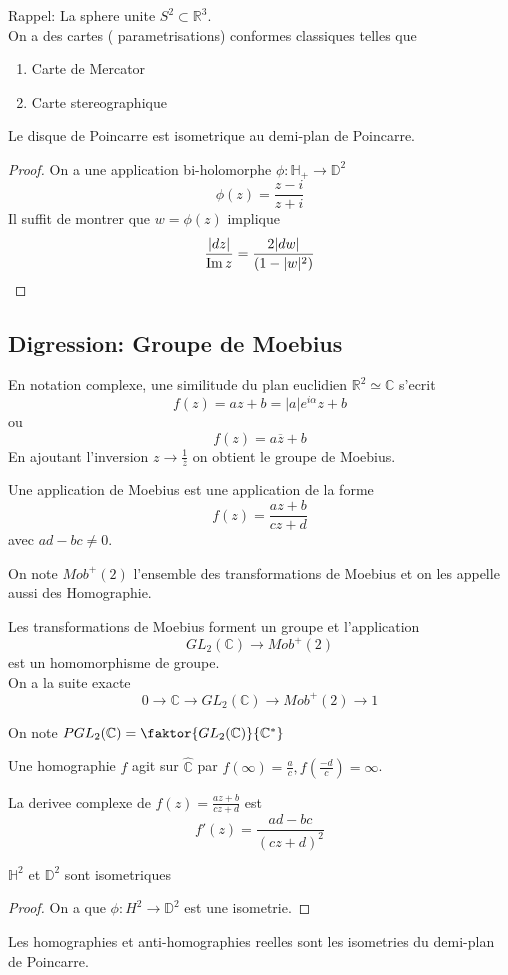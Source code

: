 \documentclass[../main.tex]{subfiles}
\begin{document}
Rappel: La sphere unite  $S^{2} \subset \mathbb{R}^{3}$.\\
On a des cartes ( parametrisations) conformes classiques telles que
\begin{enumerate}
\item Carte de Mercator
\item Carte stereographique 
\end{enumerate}
\begin{propo}
Le disque de Poincarre est isometrique au demi-plan de Poincarre.
\end{propo}
\begin{proof}
On a une application bi-holomorphe $\phi: \mathbb{H}_+ \to \mathbb{D}^{2}$ 
\[ 
\phi( z) = \frac{z-i}{z+i}
\]
Il suffit de montrer que $w= \phi( z) $ implique
\[ 
\frac{|dz|}{\operatorname{Im} z}= \frac{2 |dw|}{( 1-|w|^{2}) }
\]

\end{proof}
\subsection*{Digression: Groupe de Moebius}
En notation complexe, une similitude du plan euclidien $ \mathbb{R}^{2} \simeq \mathbb{C}$ s'ecrit 
\[ 
f( z) = az+ b = |a| e^{i\alpha} z + b
\]
ou
\[ 
f( z) = a \overline{z}+ b
\]
En ajoutant l'inversion $z \to \frac{1}{ \overline{z}}$ on obtient le groupe de Moebius.
\begin{defn}
Une application de Moebius est une application de la forme
\[ 
f( z) = \frac{az + b}{cz+d}
\]
avec $ad- bc \neq 0 $.	
\end{defn}
On note $ Mob^{+}( 2) $ l'ensemble des transformations de Moebius et on les appelle aussi des Homographie.	
\begin{propo}
Les transformations de Moebius forment un groupe et l'application 
\[ 
GL_2( \mathbb{C}) \to Mob^{+}( 2) 
\]
est un homomorphisme de groupe.\\
On a la suite exacte
\[ 
0 \to \mathbb{C}\to GL_2( \mathbb{C}) \to Mob^{+}( 2) \to 1
\]

On note $PGL_2(  \mathbb{C}) = \faktor{ GL_2( \mathbb{C}) }{ \mathbb{C}^{*}}$ 

\end{propo}
Une homographie $f$ agit sur $ \hat{ \mathbb{C}}$ par $f( \infty ) = \frac{a}{c}, f( \frac{-d}{c}) = \infty $.

\begin{lemma}
La derivee complexe de $f( z) = \frac{az+b}{cz+ d}$ est 
\[ 
f'( z) = \frac{ad- bc}{( cz+ d) ^{2}}
\]

\end{lemma}
\begin{propo}
$ \mathbb{H}^{2}$ et $ \mathbb{D}^{2}$ sont isometriques
\end{propo}
\begin{proof}
On a que $\phi: H^{2}\to \mathbb{D}^{2}$ est une isometrie.
\end{proof}
\begin{propo}
Les homographies et anti-homographies reelles sont les isometries du demi-plan de Poincarre.
\end{propo}
\end{document}
